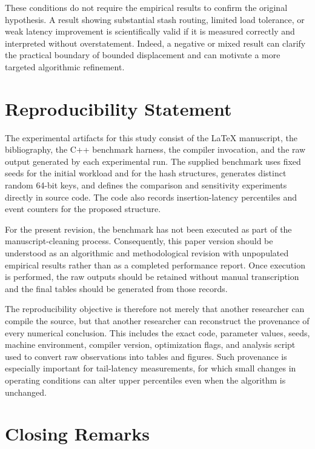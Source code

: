 \documentclass[conference]{IEEEtran}
\begin{document}
These conditions do not require the empirical results to confirm the original hypothesis. A result showing substantial stash routing, limited load tolerance, or weak latency improvement is scientifically valid if it is measured correctly and interpreted without overstatement. Indeed, a negative or mixed result can clarify the practical boundary of bounded displacement and can motivate a more targeted algorithmic refinement.

\section{Reproducibility Statement}
\label{sec:reproducibility}

The experimental artifacts for this study consist of the LaTeX manuscript, the bibliography, the C++ benchmark harness, the compiler invocation, and the raw output generated by each experimental run. The supplied benchmark uses fixed seeds for the initial workload and for the hash structures, generates distinct random 64-bit keys, and defines the comparison and sensitivity experiments directly in source code. The code also records insertion-latency percentiles and event counters for the proposed structure.

For the present revision, the benchmark has not been executed as part of the manuscript-cleaning process. Consequently, this paper version should be understood as an algorithmic and methodological revision with unpopulated empirical results rather than as a completed performance report. Once execution is performed, the raw outputs should be retained without manual transcription and the final tables should be generated from those records.

The reproducibility objective is therefore not merely that another researcher can compile the source, but that another researcher can reconstruct the provenance of every numerical conclusion. This includes the exact code, parameter values, seeds, machine environment, compiler version, optimization flags, and analysis script used to convert raw observations into tables and figures. Such provenance is especially important for tail-latency measurements, for which small changes in operating conditions can alter upper percentiles even when the algorithm is unchanged.

\section{Closing Remarks}
\label{sec:closing_remarks}
\end{document}
